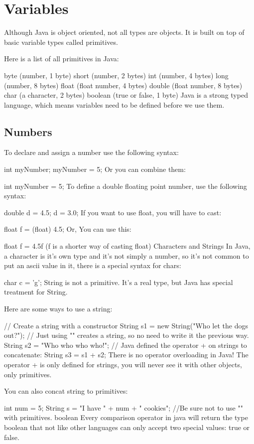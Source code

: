 \chapter{Variables}

Although Java is object oriented, not all types are objects. It is built on top of basic variable types called primitives.

Here is a list of all primitives in Java:

byte (number, 1 byte)
short (number, 2 bytes)
int (number, 4 bytes)
long (number, 8 bytes)
float (float number, 4 bytes)
double (float number, 8 bytes)
char (a character, 2 bytes)
boolean (true or false, 1 byte) Java is a strong typed language, which means variables need to be defined before we use them.

\section{Numbers}

To declare and assign a number use the following syntax:

int myNumber;
myNumber = 5;
Or you can combine them:

int myNumber = 5;
To define a double floating point number, use the following syntax:

double d = 4.5;
d = 3.0;
If you want to use float, you will have to cast:

float f = (float) 4.5;
Or, You can use this:

float f = 4.5f (f is a shorter way of casting float)
Characters and Strings
In Java, a character is it's own type and it's not simply a number, so it's not common to put an ascii value in it, there is a special syntax for chars:

char c = 'g';
String is not a primitive. It's a real type, but Java has special treatment for String.

Here are some ways to use a string:

// Create a string with a constructor
String s1 = new String("Who let the dogs out?");
// Just using "" creates a string, so no need to write it the previous way.
String s2 = "Who who who who!";
// Java defined the operator + on strings to concatenate:
String s3 = s1 + s2;
There is no operator overloading in Java! The operator + is only defined for strings, you will never see it with other objects, only primitives.

You can also concat string to primitives:

int num = 5;
String s = "I have " + num + " cookies"; //Be sure not to use "" with primitives.
boolean
Every comparison operator in java will return the type boolean that not like other languages can only accept two special values: true or false.

